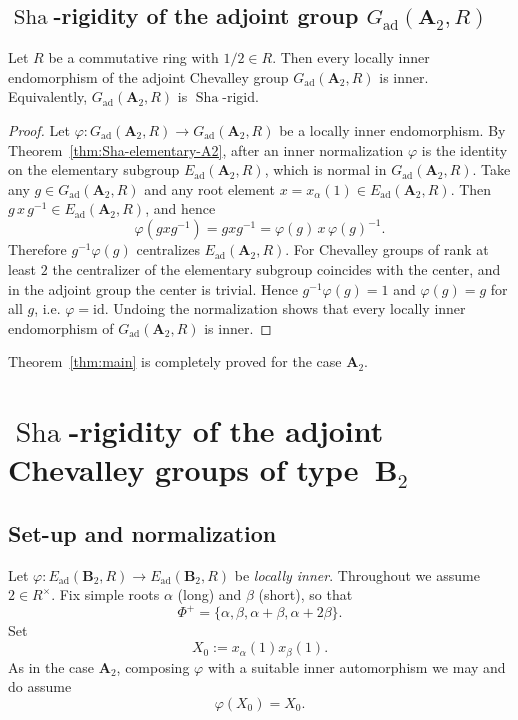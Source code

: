 \documentclass[]{jgcc}
\numberwithin{equation}{section}
\newcommand{\Sha}{\operatorname{Sha}}
\begin{document}
\subsection{\texorpdfstring{$\Sha$-rigidity of the adjoint group $G_{\mathrm{ad}}(\mathbf A_2,R)$}{Sha-rigidity of the adjoint group Gad(A2,R)}}\label{subsec:Sha-adjoint}

\begin{thm}\label{thm:A2-adjoint}
Let $R$ be a commutative ring with $1/2\in R$.
Then every locally inner endomorphism of the adjoint Chevalley group
$G_{\mathrm{ad}}(\mathbf A_2,R)$ is inner. Equivalently, $G_{\mathrm{ad}}(\mathbf A_2,R)$ is $\Sha$-rigid.
\end{thm}

\begin{proof}
Let $\varphi:G_{\mathrm{ad}}(\mathbf A_2,R)\to G_{\mathrm{ad}}(\mathbf A_2,R)$ be a locally inner endomorphism.
By Theorem~\ref{thm:Sha-elementary-A2}, after an inner normalization $\varphi$ is the identity on the elementary subgroup
$E_{\mathrm{ad}}(\mathbf A_2,R)$, which is normal in $G_{\mathrm{ad}}(\mathbf A_2,R)$.
Take any $g\in G_{\mathrm{ad}}(\mathbf A_2,R)$ and any root element $x=x_\alpha(1)\in E_{\mathrm{ad}}(\mathbf A_2,R)$.
Then $g\,x\,g^{-1}\in E_{\mathrm{ad}}(\mathbf A_2,R)$, and hence
\[
\varphi(g x g^{-1})=g x g^{-1}=\varphi(g)\,x\,\varphi(g)^{-1}.
\]
Therefore $g^{-1}\varphi(g)$ centralizes $E_{\mathrm{ad}}(\mathbf A_2,R)$.
For Chevalley groups of rank at least $2$ the centralizer of the elementary subgroup coincides with the center,
and in the adjoint group the center is trivial.
Hence $g^{-1}\varphi(g)=1$ and $\varphi(g)=g$ for all $g$, i.e. $\varphi=\mathrm{id}$.
Undoing the normalization shows that every locally inner endomorphism of $G_{\mathrm{ad}}(\mathbf A_2,R)$ is inner.
\end{proof}

\medskip
Theorem~\ref{thm:main} is completely proved for the case $\mathbf A_2$.

\section{\texorpdfstring{$\Sha$-rigidity of the adjoint Chevalley groups of type~$\mathbf B_2$}{Sha-rigidity of the adjoint Chevalley groups of type B2}}\label{sec:B2}

\subsection{Set-up and normalization}
Let $\varphi\colon E_{\mathrm{ad}}(\mathbf B_2,R)\to E_{\mathrm{ad}}(\mathbf B_2,R)$ be \emph{locally inner}.
Throughout we assume $2\in R^\times$.
Fix simple roots $\alpha$ (long) and $\beta$ (short), so that
\[
\Phi^+=\{\alpha,\beta,\alpha+\beta,\alpha+2\beta\}.
\]
Set
\[
X_0:=x_\alpha(1)x_\beta(1).
\]
As in the case $\mathbf A_2$, composing $\varphi$ with a suitable inner automorphism we may and do assume
\[
\varphi(X_0)=X_0.
\]
\end{document}
